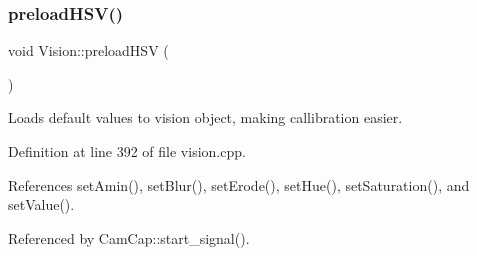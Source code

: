 \subsubsection{\texorpdfstring{preload\+H\+S\+V()}{preloadHSV()}}
{\footnotesize\ttfamily void Vision\+::preload\+H\+SV (\begin{DoxyParamCaption}{ }\end{DoxyParamCaption})}



Loads default values to vision object, making callibration easier. 



Definition at line 392 of file vision.\+cpp.



References set\+Amin(), set\+Blur(), set\+Erode(), set\+Hue(), set\+Saturation(), and set\+Value().



Referenced by Cam\+Cap\+::start\+\_\+signal().


